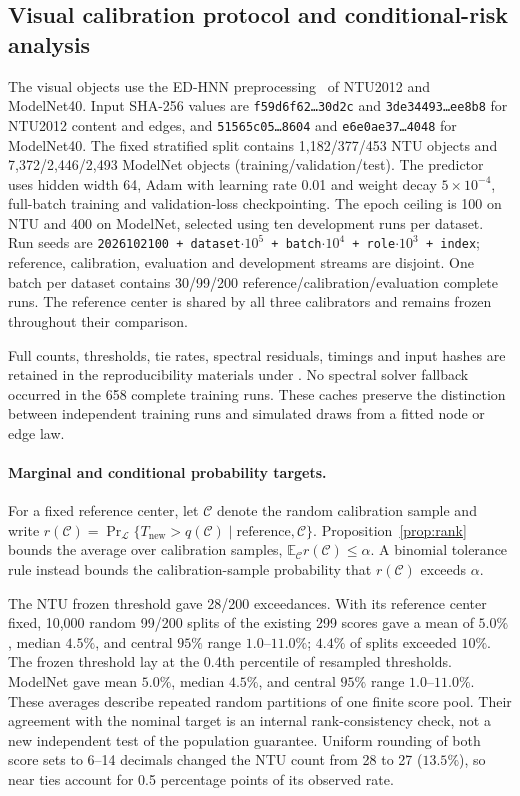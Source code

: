 \subsection{Visual calibration protocol and conditional-risk analysis}\label{app:visual}
The visual objects use the ED-HNN preprocessing~\cite{wang2023edhnn} of NTU2012 and
ModelNet40. Input SHA-256 values are
\texttt{f59d6f62\ldots 30d2c} and \texttt{3de34493\ldots ee8b8} for
NTU2012 content and edges, and \texttt{51565c05\ldots 8604} and
\texttt{e6e0ae37\ldots 4048} for ModelNet40. The fixed stratified
split contains 1,182/377/453 NTU objects and 7,372/2,446/2,493
ModelNet objects (training/validation/test). The predictor uses hidden
width 64, Adam with learning rate 0.01 and weight decay
$5\times10^{-4}$, full-batch training and validation-loss
checkpointing. The epoch ceiling is 100 on NTU and 400 on ModelNet,
selected using ten development runs per dataset. Run seeds are
\texttt{2026102100 + dataset$\cdot10^5$ + batch$\cdot10^4$ +
role$\cdot10^3$ + index}; reference, calibration, evaluation and
development streams are disjoint. One batch per dataset contains
30/99/200 reference/calibration/evaluation complete runs. The
reference center is shared by all three calibrators and remains
frozen throughout their comparison.

Full counts, thresholds, tie rates, spectral residuals, timings and
input hashes are retained in the reproducibility materials under
.
No spectral solver fallback occurred in the 658 complete training
runs. These caches preserve the distinction between independent
training runs and simulated draws from a fitted node or edge law.

\paragraph{Marginal and conditional probability targets.}
For a fixed reference center, let $\mathcal C$ denote the random
calibration sample and write
$r(\mathcal C)=\Pr_{\mathcal L}\{T_{\mathrm{new}}>q(\mathcal C)
\mid\text{reference},\mathcal C\}$.
Proposition~\ref{prop:rank} bounds the average over calibration
samples, $\mathbb E_{\mathcal C}r(\mathcal C)\le\alpha$.
A binomial tolerance rule instead bounds the calibration-sample
probability that $r(\mathcal C)$ exceeds $\alpha$.

The NTU frozen threshold gave 28/200 exceedances. With its reference
center fixed, 10,000 random 99/200 splits of the existing 299 scores
gave a mean of $5.0\%$, median $4.5\%$, and central $95\%$ range
$1.0$--$11.0\%$; $4.4\%$ of splits exceeded $10\%$. The frozen
threshold lay at the 0.4th percentile of resampled thresholds.
ModelNet gave mean $5.0\%$, median $4.5\%$, and central $95\%$ range
$1.0$--$11.0\%$. These averages describe repeated random partitions
of one finite score pool. Their agreement with the nominal target is
an internal rank-consistency check, not a new independent test of the
population guarantee. Uniform rounding of both score sets to 6--14
decimals changed the NTU count from 28 to 27 ($13.5\%$), so near ties
account for 0.5 percentage points of its observed rate.

